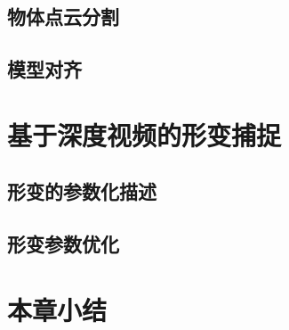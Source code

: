 \subsection{物体点云分割}

\subsection{模型对齐}

\section{基于深度视频的形变捕捉}
\subsection{形变的参数化描述}
\subsection{形变参数优化}

\section{本章小结}